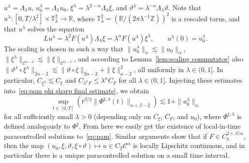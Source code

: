 \documentclass[a4paper,11pt]{article}
\theoremstyle{remark}
\newcommand{\R}{\mathbb{R}}
\newcommand{\Z}{\mathbb{Z}}
\newcommand{\CC}{\ensuremath{\mathscr{C}}}
\newcommand{\reso}{\,\mathord{\circ}\,}
\begin{document}
$u^{\lambda} = \Lambda_{\lambda} u$, $u_0^\lambda = \Lambda_\lambda u_0$, $\xi^{\lambda} = \lambda^{2- \alpha} \Lambda_{\lambda} \xi$, and $\vartheta^{\lambda} = \lambda^{-\alpha} \Lambda_{\lambda} \vartheta$. Note that $u^{\lambda} \colon [ 0,T/ \lambda^{2} ] \times \mathbb{T}_{\lambda}^{2} \rightarrow \mathbb{R}$, where
$\mathbb{T}_{\lambda}^{2} = (\R / (2\pi \lambda^{-1} \Z))^{2}$ is a rescaled torus,
and that $u^{\lambda}$ solves the equation
\[
   L u^{\lambda} = \lambda^{2} F ( u^{\lambda} ) \Lambda_{\lambda} \xi = \lambda^{\alpha} F ( u^{\lambda} ) \xi^{\lambda}, \qquad u^\lambda(0) = u^\lambda_0.
\]
The scaling is chosen in such a way that $\| u^\lambda_0 \|_\alpha \lesssim \|u_0\|_\alpha$, $\| \xi^{\lambda} \|_{\CC^{\alpha -2}} \lesssim \| \xi \|_{\CC^{\alpha -2}}$, and according to Lemma~\ref{lem:scaling commutator} also $\| \vartheta^{\lambda} \reso \xi^{\lambda} \|_{2 \alpha -2} \lesssim \| \vartheta \reso \xi \|_{2 \alpha -2} + \|\xi\|_{\alpha-2}^2$, all uniformly in $\lambda \in (0,1]$. In particular, $C_{\xi^{\lambda}} \lesssim C_{\xi}$ and
$C_{\lambda^{\alpha} F} \leqslant \lambda^{\alpha} C_{F}$ for all $\lambda \in (0,1]$. Injecting these estimates into~\eqref{eq:pam phi sharp final estimate}, we obtain
\[
   \sup_{t \in [ 0,T]} (t^{\beta /2} \| \Phi^{\sharp,\lambda} ( t ) \|_{\alpha+\beta -2}) \lesssim 1 + \|u_0^\lambda\|_\alpha
\]
for all sufficiently small $\lambda > 0$ (depending only on $C_\xi$, $C_F$, and $u_0$), where $\Phi^{\sharp,\lambda}$ is defined analogously to $\Phi^\sharp$. From here we easily get the existence of local-in-time paracontrolled solutions to~\eqref{eq:pam}. 
%
Similar arguments show that if $F \in C^{2+\beta/\alpha}_{b}$, then the map $(u_{0} , \xi , \vartheta , \xi \reso \vartheta ) \mapsto u \in C_T \CC^{\alpha}$ is
locally Lipschitz continuous, and in particular there is a unique paracontrolled solution on a small time interval.
\end{document}

